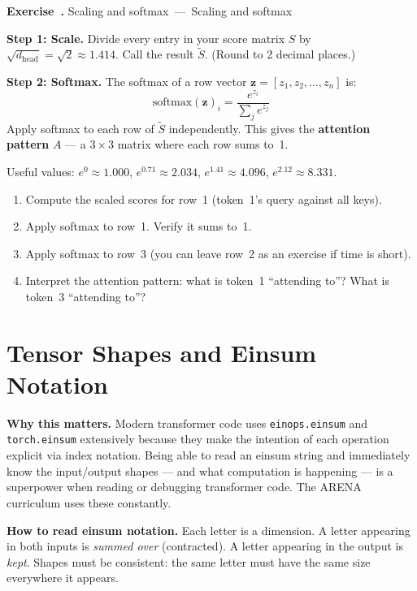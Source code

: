 \documentclass[11pt, a4paper]{article}
\newcounter{exercise}[section]
\renewcommand{\theexercise}{\thesection.\arabic{exercise}}
\newenvironment{exercise}[1][]{%
    \refstepcounter{exercise}%
    \par\medskip\noindent%
    \textbf{Exercise~\theexercise}%
    \ifx\relax#1\relax\else\ ---\ #1\fi\par\smallskip%
}{%
    \par\medskip%
}
\newcommand{\code}[1]{\texttt{#1}}
\renewcommand{\vec}[1]{\mathbf{#1}}
\begin{document}
\begin{exercise}[Scaling and softmax]
\textbf{Step 1: Scale.}
Divide every entry in your score matrix $S$ by
$\sqrt{d_{\mathrm{head}}} = \sqrt{2} \approx 1.414$.
Call the result $\tilde{S}$. (Round to 2 decimal places.)

\medskip
\textbf{Step 2: Softmax.}
The softmax of a row vector $\vec{z} = [z_1, z_2, \ldots, z_n]$ is:
\[
    \mathrm{softmax}(\vec{z})_i = \frac{e^{z_i}}{\displaystyle\sum_j e^{z_j}}
\]
Apply softmax to each row of $\tilde{S}$ independently. This gives the
\textbf{attention pattern} $A$ --- a $3 \times 3$ matrix where each row sums to~1.

\medskip
Useful values:
$e^0 \approx 1.000$,\;
$e^{0.71} \approx 2.034$,\;
$e^{1.41} \approx 4.096$,\;
$e^{2.12} \approx 8.331$.

\begin{enumerate}[label=(\alph*)]
    \item Compute the scaled scores for row~1 (token~1's query against all keys).
    \item Apply softmax to row~1. Verify it sums to~1.
    \item Apply softmax to row~3 (you can leave row~2 as an exercise if time is short).
    \item Interpret the attention pattern: what is token~1 ``attending to''?
          What is token~3 ``attending to''?
\end{enumerate}
\end{exercise}

\section{Tensor Shapes and Einsum Notation}

\begin{motivbox}
\textbf{Why this matters.}
Modern transformer code uses \code{einops.einsum} and \code{torch.einsum} extensively
because they make the intention of each operation explicit via index notation. Being able
to read an einsum string and immediately know the input/output shapes --- and what
computation is happening --- is a superpower when reading or debugging transformer code.
The ARENA curriculum uses these constantly.

\textbf{How to read einsum notation.} Each letter is a dimension. A letter appearing in
both inputs is \emph{summed over} (contracted). A letter appearing in the output is
\emph{kept}. Shapes must be consistent: the same letter must have the same size everywhere
it appears.
\end{motivbox}
\end{document}
